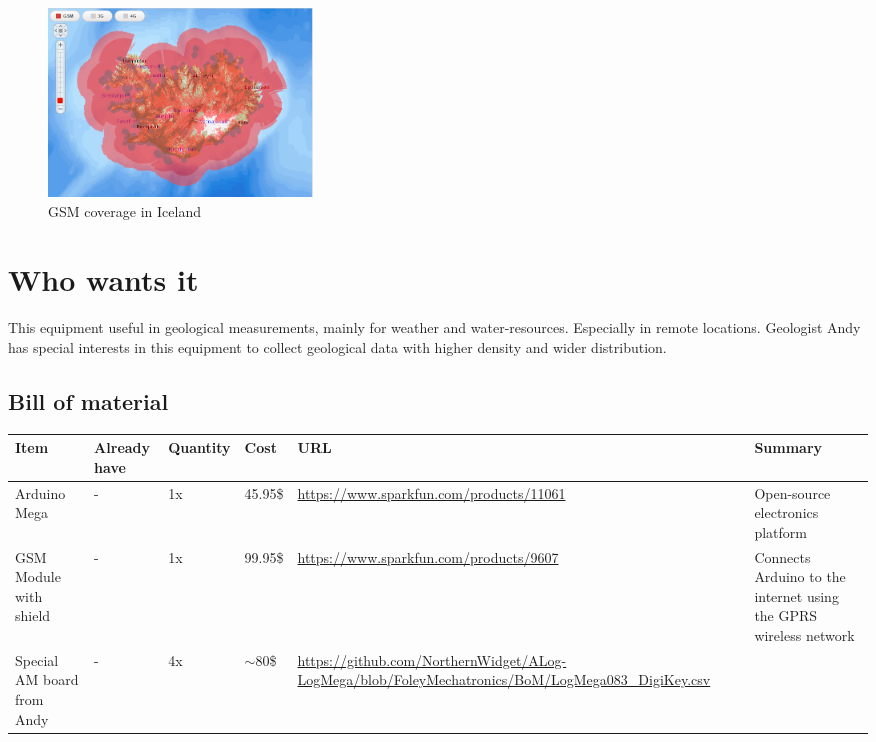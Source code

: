 \documentclass[12pt,a4paper,titlepage]{article}
\begin{document}
\begin{figure}
\centering
\includegraphics[height=50mm]{graphics/GSM_Coverage.PNG}
\caption{GSM coverage in Iceland\label{fig:GSM-Coverage} \cite{vodafone}}
\end{figure}


\section{Who wants it} 
 This equipment useful in geological measurements, mainly for weather and water-resources. Especially in remote locations. 
 Geologist Andy has special interests in this equipment to collect geological data with higher density and wider distribution. 
 


\subsection{Bill of material} %
\begin{center}
    \begin{tabular}{ | p{1.5cm} | p{1.4cm} | p{1.5cm} | l | p{5.5cm} | p{5cm} |}
    \hline
    Item & Already have & Quantity & Cost & URL & Summary \\ \hline
    
    Arduino Mega & - & 1x & 45.95\$ & \url{https://www.sparkfun.com/products/11061} & Open-source electronics platform \\ \hline
    
    GSM Module with shield & - & 1x & 99.95\$ & \url{https://www.sparkfun.com/products/9607} & Connects Arduino to the internet using the GPRS wireless network \\ \hline
    
	Special AM board from Andy & - & 4x & $\sim$80\$ & \url{https://github.com/NorthernWidget/ALog-LogMega/blob/FoleyMechatronics/BoM/LogMega083_DigiKey.csv} &  \\ \hline
    \end{tabular}
\end{center}
 



\end{document}
